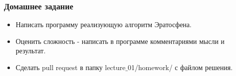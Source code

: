\documentclass[russian, 12pt]{beamer}
\begin{document}
\begin{frame}
\frametitle{Домашнее задание}
\begin{itemize}
  \item Написать программу реализующую алгоритм Эратосфена.
  \item Оценить сложность - написать в программе комментариями мысли и результат.
  \item Сделать pull request в папку lecture$\_$01/homework/ с файлом решения.
\end{itemize}
\end{frame}
\end{document}
